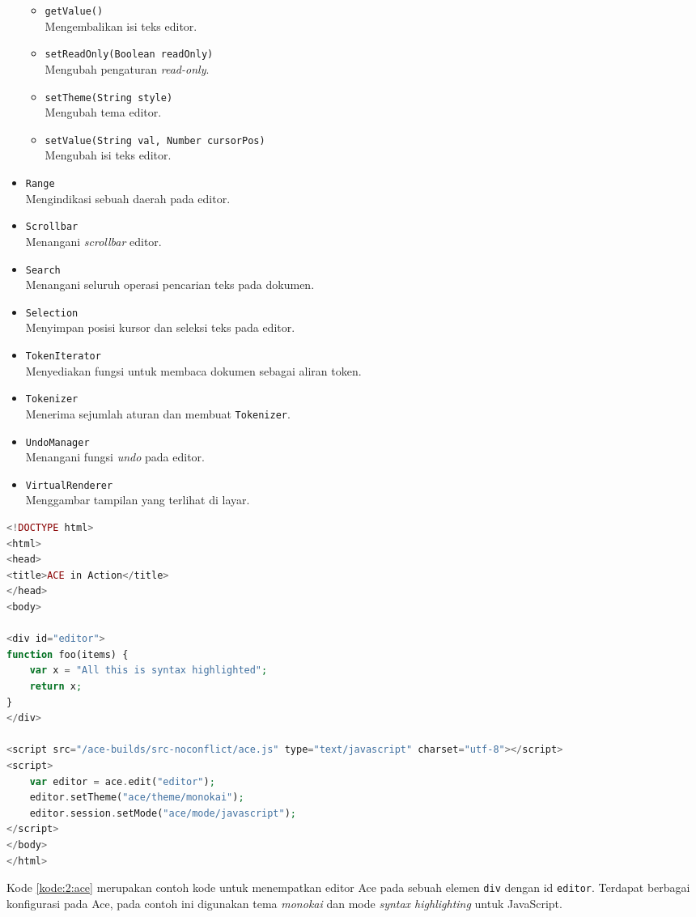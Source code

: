 \begin{itemize}
\begin{itemize}
            \item \verb|getValue()| \\ Mengembalikan isi teks editor.
            \item \verb|setReadOnly(Boolean readOnly)| \\ Mengubah pengaturan \textit{read-only}.
            \item \verb|setTheme(String style)| \\ Mengubah tema editor.
            \item \verb|setValue(String val, Number cursorPos)| \\ Mengubah isi teks editor.
        \end{itemize}
    \item \verb|Range| \\ Mengindikasi sebuah daerah pada editor.
    \item \verb|Scrollbar| \\ Menangani \textit{scrollbar} editor.
    \item \verb|Search| \\ Menangani seluruh operasi pencarian teks pada dokumen.
    \item \verb|Selection| \\ Menyimpan posisi kursor dan seleksi teks pada editor.
    \item \verb|TokenIterator| \\ Menyediakan fungsi untuk membaca dokumen sebagai aliran token.
    \item \verb|Tokenizer| \\ Menerima sejumlah aturan dan membuat \verb|Tokenizer|.
    \item \verb|UndoManager| \\ Menangani fungsi \textit{undo} pada editor.
    \item \verb|VirtualRenderer| \\ Menggambar tampilan yang terlihat di layar.
\end{itemize}


\begin{lstlisting}[language=php, caption=Contoh kode untuk menggunakan Ace, label=kode:2:ace]
<!DOCTYPE html>
<html>
<head>
<title>ACE in Action</title>
</head>
<body>

<div id="editor">
function foo(items) {
    var x = "All this is syntax highlighted";
    return x;
}
</div>
    
<script src="/ace-builds/src-noconflict/ace.js" type="text/javascript" charset="utf-8"></script>
<script>
    var editor = ace.edit("editor");
    editor.setTheme("ace/theme/monokai");
    editor.session.setMode("ace/mode/javascript");
</script>
</body>
</html>
\end{lstlisting} 

Kode \ref{kode:2:ace} merupakan contoh kode untuk menempatkan editor Ace pada sebuah elemen \verb|div| dengan id \verb|editor|. Terdapat berbagai konfigurasi pada Ace, pada contoh ini digunakan tema \textit{monokai} dan mode \textit{syntax highlighting} untuk JavaScript.




